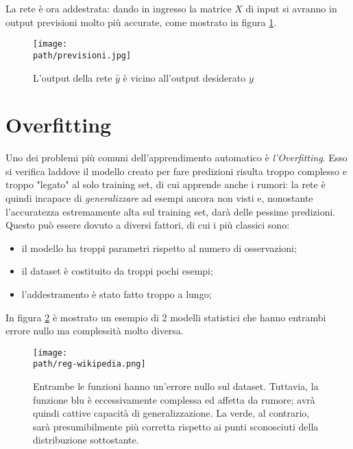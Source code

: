 La rete è ora addestrata: dando in ingresso la matrice $X$ di input si avranno in output previsioni molto più accurate, come mostrato in figura \ref{fig:previsioni}. 
\begin{figure}[h!]
 \centering
 \texttt{[image: \\path/previsioni.jpg]}
 \caption{L'output della rete $\hat{y}$ è vicino all'output desiderato $y$}
 \label{fig:previsioni}
\end{figure}

\section{Overfitting}
Uno dei problemi più comuni dell'apprendimento automatico è \emph{l'Overfitting}. Esso si verifica laddove il modello creato per fare predizioni risulta troppo complesso e troppo "legato" al solo training set, di cui apprende anche i rumori: la rete è quindi incapace di \emph{generalizzare} ad esempi ancora non visti e, nonostante l'accuratezza estremamente alta sul training set, darà delle pessime predizioni. Questo può essere dovuto a diversi fattori, di cui i più classici sono: 
\begin{itemize}
\item il modello ha troppi parametri rispetto al numero di osservazioni; 
\item il dataset è costituito da troppi pochi esempi; 
\item l'addestramento è stato fatto troppo a lungo;
\end{itemize}

In figura \ref{fig:regularization} è mostrato un esempio di 2 modelli statistici che hanno entrambi errore nullo ma complessità molto diversa. 
\begin{figure}[h!]
 \centering
 \texttt{[image: \\path/reg-wikipedia.png]}
 \caption{Entrambe le funzioni hanno un'errore nullo sul dataset. Tuttavia, la funzione blu è eccessivamente complessa ed affetta da rumore; avrà quindi cattive capacità di generalizzazione. La verde, al contrario, sarà presumibilmente più corretta rispetto ai punti sconosciuti della distribuzione sottostante.}
 \label{fig:regularization}
\end{figure}
